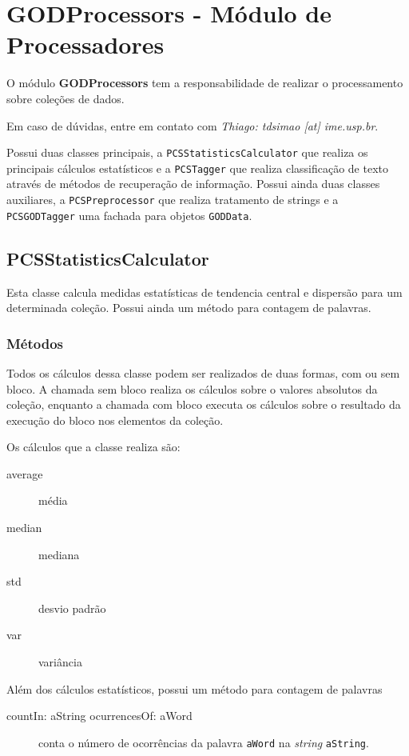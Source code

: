 

\section{GODProcessors - Módulo de Processadores}

O módulo \textbf{GODProcessors} tem a responsabilidade de realizar o processamento sobre
coleções de dados.

Em caso de dúvidas, entre em contato com \emph{Thiago: tdsimao [at] ime.usp.br}.

Possui duas classes principais, a \texttt{PCSStatisticsCalculator} que realiza os principais
cálculos estatísticos e a \texttt{PCSTagger} que realiza classificação de texto através de
métodos de recuperação de informação. Possui ainda duas classes auxiliares, a
\texttt{PCSPreprocessor} que realiza tratamento de strings e a \texttt{PCSGODTagger} uma fachada
para objetos \texttt{GODData}.

\subsection{PCSStatisticsCalculator} 

Esta classe calcula medidas estatísticas de tendencia central e dispersão para um determinada
coleção. Possui ainda um método para contagem de palavras.


\subsubsection{Métodos}
Todos os cálculos dessa classe podem ser realizados de duas formas, com ou sem bloco. A chamada
sem bloco realiza os cálculos sobre o valores absolutos da coleção, enquanto a chamada com
bloco executa os cálculos sobre o resultado da execução do bloco nos elementos da coleção.

Os cálculos que a classe realiza são:
\begin{description}
    \item[average]  média 
    \item[median] mediana
    \item[std] desvio padrão
    \item[var] variância
\end{description}

Além dos cálculos estatísticos, possui um método para contagem de palavras

\begin{description}
    \item[countIn: aString ocurrencesOf: aWord] conta o número de ocorrências da palavra
                   \texttt{aWord} na \textit{string} \texttt{aString}.
\end{description}

